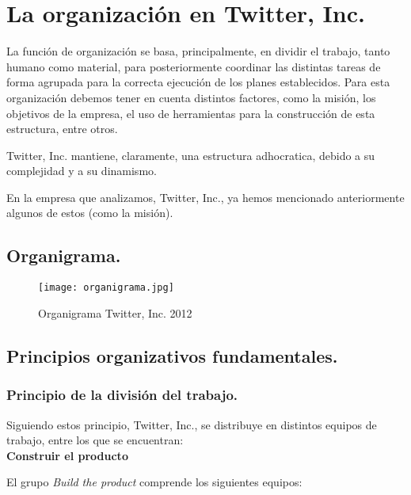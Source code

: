 
\section{La organización en Twitter, Inc.}

La función de organización se basa, principalmente, en dividir el trabajo, tanto humano como material, para posteriormente coordinar las distintas tareas de forma agrupada para la correcta ejecución de los planes establecidos. Para esta organización debemos tener en cuenta distintos factores, como la misión, los objetivos de la empresa, el uso de herramientas para la construcción de esta estructura, entre otros.

Twitter, Inc. mantiene, claramente, una estructura adhocratica, debido a su complejidad y a su dinamismo.

En la empresa que analizamos, Twitter, Inc., ya hemos mencionado anteriormente algunos de estos (como la misión).

\newpage

\subsection{Organigrama.}

\begin{figure}[!htb]
\centering
\texttt{[image: organigrama.jpg]}
\caption{\label{fig:frog}Organigrama Twitter, Inc. 2012}
\end{figure}


\subsection{Principios organizativos fundamentales.}

\subsubsection{Principio de la división del trabajo.}

Siguiendo estos principio, Twitter, Inc., se distribuye en distintos equipos de trabajo, entre los que se encuentran:\\

\textbf{Construir el producto}

El grupo \textit{Build the product} comprende los siguientes equipos:

